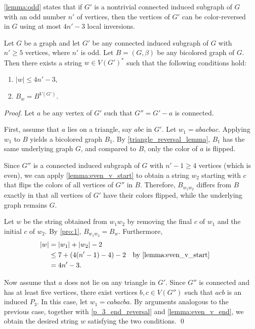 \documentclass[runningheads,orivec]{llncs}
\begin{document}
\autoref{lemma:odd} states that if $G'$ is a nontrivial connected induced subgraph of $G$ with an odd number $n'$ of vertices, then the vertices of $G'$ can be color-reversed in $G$ using at most $4n'-3$ local inversions.

\begin{lemma}\label{lemma:odd}
Let $G$ be a graph and let $G'$ be any connected induced subgraph of $G$ with $n' \geq 5$ vertices, where $n'$ is odd. 
Let $B = (G, \beta)$ be any bicolored graph of $G$. 
Then there exists a string $w \in V(G')^*$ such that the following conditions hold:
\begin{enumerate}
    \item $|w| \leq 4n' - 3$,
    \item $B_w = B^{V(G')}$.
\end{enumerate}
\end{lemma}

\begin{proof}
    Let $a$ be any vertex of $G'$ such that $G'' = G' - a$ is connected. 
    
    First, assume that $a$ lies on a triangle, say $abc$ in $G'$.  
    Let $w_1 = abacbac$.  
    Applying $w_1$ to $B$ yields a bicolored graph $B_1$. By \autoref{triangle_reversal_lemma}, $B_1$ has the same underlying graph $G$, and compared to $B$, only the color of $a$ is flipped.  
    
    Since $G''$ is a connected induced subgraph of $G$ with $n'-1 \geq 4$ vertices (which is even), we can apply \autoref{lemma:even_v_start} to obtain a string $w_2$ starting with $c$ that flips the colors of all vertices of $G''$ in $B$. Therefore, $B_{w_1w_2}$ differs from $B$ exactly in that all vertices of $G'$ have their colors flipped, while the underlying graph remains $G$.  
    
    Let $w$ be the string obtained from $w_1w_2$ by removing the final $c$ of $w_1$ and the initial $c$ of $w_2$. By \autoref{pro:1}, $B_{w_1w_2} = B_w$. Furthermore,
    \begin{align*}
        |w| &= |w_1| + |w_2| - 2 \\
            &\leq 7 + (4(n'-1)-4) - 2 && \text{by \autoref{lemma:even_v_start}} \\
            &= 4n' - 3.
    \end{align*}

    Now assume that $a$ does not lie on any triangle in $G'$. 
    Since $G''$ is connected and has at least five vertices, there exist vertices $b, c \in V(G'')$ such that $acb$ is an induced $P_3$. 
    In this case, let $w_1 = cabacba$.  
    By arguments analogous to the previous case, together with \autoref{p_3_end_reversal} and \autoref{lemma:even_v_end}, we obtain the desired string $w$ satisfying the two conditions. 
    \qed
\end{proof}
\end{document}

